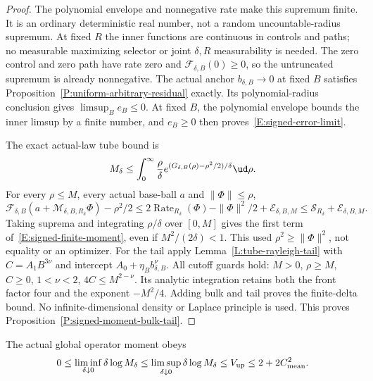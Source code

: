 \begin{proof}
  The polynomial envelope and nonnegative rate make this supremum
  finite. It is an ordinary deterministic real number, not a
  random uncountable-radius supremum.
  At fixed $R$ the inner functions are continuous in controls and paths;
  no measurable maximizing selector or joint $\delta,R$ measurability is needed.
  The zero control and zero path have rate zero and
  $\mathcal F_{\delta,B}(0)\ge0$, so the untruncated supremum
  is already nonnegative.
  The actual anchor $b_{\delta,B}\to0$ at fixed $B$ satisfies
  Proposition~\ref{P:uniform-arbitrary-residual} exactly.
  Its polynomial-radius conclusion gives $\limsup_B e_B\le0$.
  At fixed $B$, the polynomial envelope bounds the inner limsup by
  a finite number, and $e_B\ge0$ then proves~\eqref{E:signed-error-limit}.

  The exact actual-law tube bound is
  \[
    M_\delta\le\int_0^\infty\frac{\rho}{\delta}
    e^{(G_{\delta,B}(\rho)-\rho^2/2)/\delta}\ud\rho .
  \]
  For every $\rho\le M$, every actual base-ball $a$ and
  $\|\Phi\|\le\rho$,
  \[
    \mathcal F_{\delta,B}(a+\mathcal M_{\delta,B,R_\delta}\Phi)-\rho^2/2
    \le2\operatorname{Rate}_{R_\delta}(\Phi)-\|\Phi\|^2/2
    +\mathcal E_{\delta,B,M}
    \le\mathcal S_{R_\delta}+\mathcal E_{\delta,B,M}.
  \]
  Taking suprema and integrating $\rho/\delta$ over $[0,M]$
  gives the first term of~\eqref{E:signed-finite-moment},
  even if $M^2/(2\delta)<1$.
  This used $\rho^2\ge\|\Phi\|^2$, not equality or an optimizer.
  For the tail apply Lemma~\ref{L:tube-rayleigh-tail} with
  $C=A_1B^{3\nu}$ and intercept $A_0+\eta_Bb_{\delta,B}^\nu$.
  All cutoff guards hold: $M>0$, $\rho\ge M$, $C\ge0$,
  $1<\nu<2$, $4C\le M^{2-\nu}$.
  Its analytic integration retains both the front factor four
  and the exponent $-M^2/4$.
  Adding bulk and tail proves the finite-delta bound.
  No infinite-dimensional density or Laplace principle is used.
  This proves Proposition~\ref{P:signed-moment-bulk-tail}.
\end{proof}

\begin{proposition}
  \label{P:signed-operator-upper}
  The actual global operator moment obeys
  \[
    0\le\liminf_{\delta\downarrow0}\delta\log M_\delta
    \le\limsup_{\delta\downarrow0}\delta\log M_\delta
    \le V_{\rm up}\le2+2C_{\rm mean}^2 .
  \]
\end{proposition}

